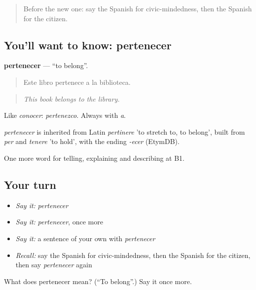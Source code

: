 \label{lesson:ES-C600-pertenecer}



\begin{quote}
Before the new one: say the Spanish for civic-mindedness, then the Spanish for the citizen.
\end{quote}

\subsection*{You'll want to know: pertenecer}
\textbf{pertenecer} — \textquotedblleft{}to belong\textquotedblright{}.

\begin{quote}
Este libro pertenece a la biblioteca.
\end{quote}

\begin{quote}
\emph{This book belongs to the library.}
\end{quote}

Like \emph{conocer}: \emph{pertenezco}. Always with \emph{a}.

\begin{cousinweb}
\emph{pertenecer} is inherited from Latin \emph{pertinere} 'to stretch to, to belong', built from \emph{per} and \emph{tenere} 'to hold', with the ending \emph{-ecer} (EtymDB).
\end{cousinweb}

\begin{grammarlens}[title={What you've built}]
One more word for telling, explaining and describing at B1.
\end{grammarlens}

\subsection*{Your turn}
\begin{itemize}
\raggedright
  \item \emph{Say it:} \emph{pertenecer}
  \item \emph{Say it:} \emph{pertenecer}, once more
  \item \emph{Say it:} a sentence of your own with \emph{pertenecer}
  \item \emph{Recall:} say the Spanish for civic-mindedness, then the Spanish for the citizen, then say \emph{pertenecer} again
\end{itemize}

\begin{tcolorbox}[breakable,colback=teal!4,colframe=teal!35!black,title={Before you move on}]
What does pertenecer mean? (\textquotedblleft{}To belong\textquotedblright{}.) Say it once more.
\end{tcolorbox}
